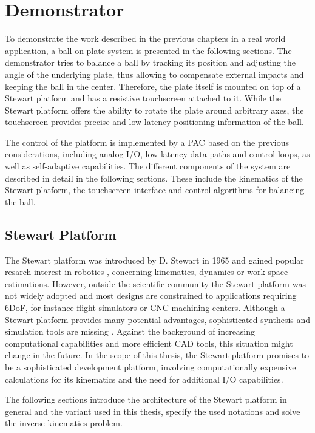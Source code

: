 \chapter{Demonstrator}
\label{chap:demonstrator}

To demonstrate the work described in the previous chapters in a real world
application, a ball on plate system is presented in the following sections.
The demonstrator tries to balance a ball by tracking its position and
adjusting the angle of the underlying plate, thus allowing to compensate
external impacts and keeping the ball in the center. Therefore, the plate
itself is mounted on top of a Stewart platform and has a resistive touchscreen
attached to it. While the Stewart platform offers the ability to rotate the
plate around arbitrary axes, the touchscreen provides precise and low latency
positioning information of the ball.

The control of the platform is implemented by a \ac{PAC} based on the previous
considerations, including analog I/O, low latency data paths and control
loops, as well as self-adaptive capabilities. The different components of the
system are described in detail in the following sections. These include the
kinematics of the Stewart platform, the touchscreen interface and control
algorithms for balancing the ball.

\section{Stewart Platform}
The Stewart platform was introduced by D. Stewart in 1965 \citep{Ste65} and
gained popular resarch interest in robotics \citep{Szu13}, concerning
kinematics, dynamics or work space estimations. However, outside the
scientific community the Stewart platform was not widely adopted and most
designs are constrained to applications requiring \ac{6DoF}, for instance
flight simulators or \ac{CNC} machining centers. Although a Stewart platform
provides many potential advantages, sophisticated synthesis and simulation
tools are missing \citep{Ji96}. Against the background of increasing
computational capabilities and more efficient \ac{CAD} tools, this situation
might change in the future. In the scope of this thesis, the Stewart platform
promises to be a sophisticated development platform, involving computationally
expensive calculations for its kinematics and the need for additional I/O
capabilities.

The following sections introduce the architecture of the Stewart platform in
general and the variant used in this thesis, specify the used notations and
solve the inverse kinematics problem.

